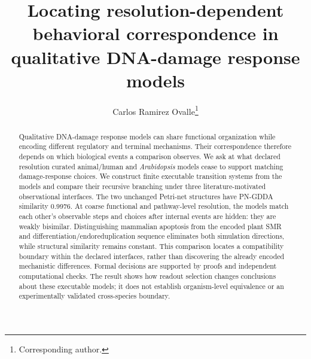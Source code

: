 \documentclass{ws-jbcb}
\numberwithin{equation}{section}
\begin{document}
\catchline{}{}{}{}{}

\title{Locating resolution-dependent behavioral correspondence in qualitative DNA-damage response models}

\author{Carlos Ramirez Ovalle\footnote{Corresponding author.}}

\address{Department of Natural Sciences and Mathematics, Pontificia Universidad
Javeriana Cali, Calle 18 No. 118-250, Via a Pance, Cali, Valle del Cauca,
Colombia\\
carlosovalle@javerianacali.edu.co}

\maketitle

\begin{abstract}
Qualitative DNA-damage response models can share functional organization while
encoding different regulatory and terminal mechanisms. Their correspondence
therefore depends on which biological events a comparison observes. We ask at
what declared resolution curated animal/human and \textit{Arabidopsis} models
cease to support matching damage-response choices. We construct finite
executable transition systems from the models and compare their recursive
branching under three literature-motivated observational interfaces. The two
unchanged Petri-net structures have PN-GDDA similarity 0.9976. At coarse
functional and pathway-level resolution, the models match each other's
observable steps and choices after internal events are hidden: they are weakly
bisimilar. Distinguishing mammalian apoptosis from the encoded plant SMR and
differentiation/endoreduplication sequence eliminates both simulation directions,
while structural similarity remains constant. This comparison locates a
compatibility boundary within the declared interfaces, rather than discovering
the already encoded mechanistic differences. Formal decisions are supported by
proofs and independent computational checks. The result shows how readout
selection changes conclusions about these executable models; it does not
establish organism-level equivalence or an experimentally validated
cross-species boundary.

\end{abstract}

\end{document}
